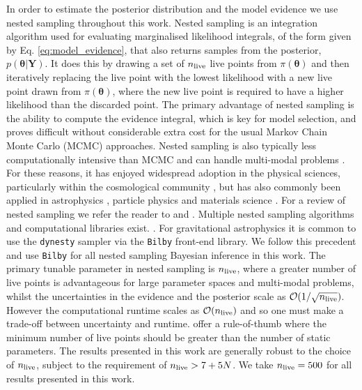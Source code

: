 \documentclass[fleqn,usenatbib,useAMS]{mnras}
\begin{document}
In order to estimate the posterior distribution and the model evidence we use nested sampling \citep{Skilling} throughout this work. Nested sampling is an integration algorithm used for evaluating marginalised likelihood integrals, of the form given by Eq. \ref{eq:model_evidence}, that also returns samples from the posterior, $p(\boldsymbol{\theta} | \boldsymbol{Y})$. It does this by drawing a set of $n_{\rm live}$ live points from $\pi(\boldsymbol{\theta})$ and then iteratively replacing the live point with the lowest likelihood with a new live point drawn from $\pi(\boldsymbol{\theta})$, where the new live point is required to have a higher likelihood than the discarded point. The primary advantage of nested sampling is the ability to compute the evidence integral, which is key for model selection, and proves difficult without considerable extra cost for the usual Markov Chain Monte Carlo (MCMC) approaches. Nested sampling is also typically less computationally intensive than MCMC and can handle multi-modal problems \citep{Ashton2022}. For these reasons, it has enjoyed widespread adoption in the physical sciences, particularly within the cosmological community \citep{Mukherjee2006,Feroz2008,Handley2015}, but has also commonly been applied in astrophysics \citep{UltraNest2021}, particle physics \citep{proceedings2019033014} and materials science \citep{2009arXiv0906materials}. For a review of nested sampling we refer the reader to \cite{Buchner2021} and \cite{Ashton2022}. Multiple nested sampling algorithms and computational libraries exist. \citep[e.g.][]{Feroz2008,Feroz2009,Handley2015,dynesty2020,UltraNest2021}. For gravitational astrophysics it is common to use the \texttt{dynesty} sampler \citep{dynesty2020} via the \texttt{Bilby} \cite{bilby.507.2037A} front-end library. We  follow this precedent and use \texttt{Bilby} for all nested sampling Bayesian inference in this work. The primary tunable parameter in nested sampling is $n_{\rm live}$, where a greater number of live points is advantageous for large parameter spaces and multi-modal problems, whilst the uncertainties in the evidence and the posterior scale as $\mathcal{O}(1/\sqrt{n_{\rm live}})$. However the computational runtime scales as $\mathcal{O}(n_{\rm live})$ and so one must make a trade-off between uncertainty and runtime. \cite{Ashton2022} offer a rule-of-thumb where the minimum number of live points should be greater than the number of static parameters. The results presented in this work are generally robust to the choice of $n_{\rm live}$, subject to the requirement of $n_{\rm live} > 7 + 5N$. We take $n_{\rm live} = 500$ for all results presented in this work. 
\end{document}
